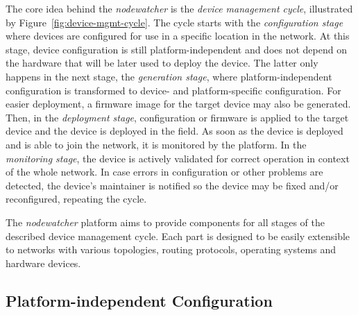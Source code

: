 \documentclass[5p,sort&compress]{elsarticle}
\newcommand{\nodewatcher}{\textit{nodewatcher}}
\begin{document}
The core idea behind the \nodewatcher{} is the \textit{device management cycle}, illustrated by Figure~\ref{fig:device-mgmt-cycle}.
The cycle starts with the \textit{configuration stage} where devices are configured for use in a specific location in the network.
At this stage, device configuration is still platform-independent and does not depend on the hardware that will be later used to deploy the device.
The latter only happens in the next stage, the \textit{generation stage}, where platform-independent configuration is transformed to device- and platform-specific configuration.
For easier deployment, a firmware image for the target device may also be generated.
Then, in the \textit{deployment stage}, configuration or firmware is applied to the target device and the device is deployed in the field.
As soon as the device is deployed and is able to join the network, it is monitored by the platform.
In the \textit{monitoring stage}, the device is actively validated for correct operation in context of the whole network.
In case errors in configuration or other problems are detected, the device's maintainer is notified so the device may be fixed and/or reconfigured, repeating the cycle.

The \nodewatcher{} platform aims to provide components for all stages of the described device management cycle.
Each part is designed to be easily extensible to networks with various topologies, routing protocols, operating systems and hardware devices.

\subsection{Platform-independent Configuration}
\label{sec:platform-independent-configuration}
\end{document}
